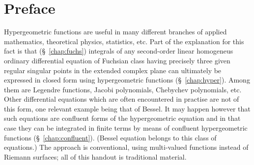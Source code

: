 \chapter*{Preface}

Hypergeometric functions  are useful in many different branches of applied
mathematics, theoretical physics, statistics, etc.  Part of the  explanation for
this fact is that (\S~\ref{chap:fuchs}) integrals of any
second-order linear homogeneus ordinary differential equation of Fuchsian class
having precisely three given regular singular points in the extended complex
plane can ultimately be expressed in closed form using hypergeometric
functions (\S~\ref{chap:hyper}). Among them are Legendre
functions, Jacobi polynomials, Chebychev polynomials, etc.  Other differential
equations which are often encountered in practise are not of this form, one
relevant example being that of Bessel.  It may happen  however  that such
equations are confluent forms of the hypergeometric equation and in that case
they can be integrated in finite terms by means of confluent hypergeometric
functions (\S~\ref{chap:confluent}). (Bessel equation belongs to this class of
equations.) The approach is conventional, using multi-valued functions instead of Riemann surfaces; all of this handout is traditional material.

\smallskip

\noindent\textsw{\myLocation, \myTime}


\begin{flushright}
        \myName
\end{flushright}

